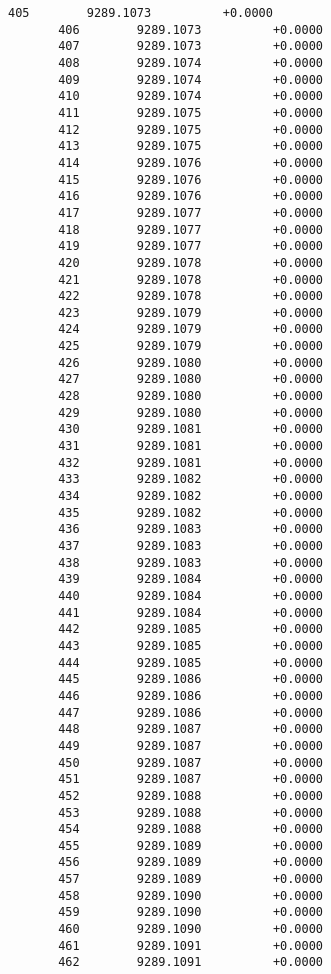 \documentclass[11pt]{article}
\begin{document}
\begin{Verbatim}[commandchars=\\\{\}]
       405        9289.1073          +0.0000
       406        9289.1073          +0.0000
       407        9289.1073          +0.0000
       408        9289.1074          +0.0000
       409        9289.1074          +0.0000
       410        9289.1074          +0.0000
       411        9289.1075          +0.0000
       412        9289.1075          +0.0000
       413        9289.1075          +0.0000
       414        9289.1076          +0.0000
       415        9289.1076          +0.0000
       416        9289.1076          +0.0000
       417        9289.1077          +0.0000
       418        9289.1077          +0.0000
       419        9289.1077          +0.0000
       420        9289.1078          +0.0000
       421        9289.1078          +0.0000
       422        9289.1078          +0.0000
       423        9289.1079          +0.0000
       424        9289.1079          +0.0000
       425        9289.1079          +0.0000
       426        9289.1080          +0.0000
       427        9289.1080          +0.0000
       428        9289.1080          +0.0000
       429        9289.1080          +0.0000
       430        9289.1081          +0.0000
       431        9289.1081          +0.0000
       432        9289.1081          +0.0000
       433        9289.1082          +0.0000
       434        9289.1082          +0.0000
       435        9289.1082          +0.0000
       436        9289.1083          +0.0000
       437        9289.1083          +0.0000
       438        9289.1083          +0.0000
       439        9289.1084          +0.0000
       440        9289.1084          +0.0000
       441        9289.1084          +0.0000
       442        9289.1085          +0.0000
       443        9289.1085          +0.0000
       444        9289.1085          +0.0000
       445        9289.1086          +0.0000
       446        9289.1086          +0.0000
       447        9289.1086          +0.0000
       448        9289.1087          +0.0000
       449        9289.1087          +0.0000
       450        9289.1087          +0.0000
       451        9289.1087          +0.0000
       452        9289.1088          +0.0000
       453        9289.1088          +0.0000
       454        9289.1088          +0.0000
       455        9289.1089          +0.0000
       456        9289.1089          +0.0000
       457        9289.1089          +0.0000
       458        9289.1090          +0.0000
       459        9289.1090          +0.0000
       460        9289.1090          +0.0000
       461        9289.1091          +0.0000
       462        9289.1091          +0.0000

\end{Verbatim}
\end{document}
